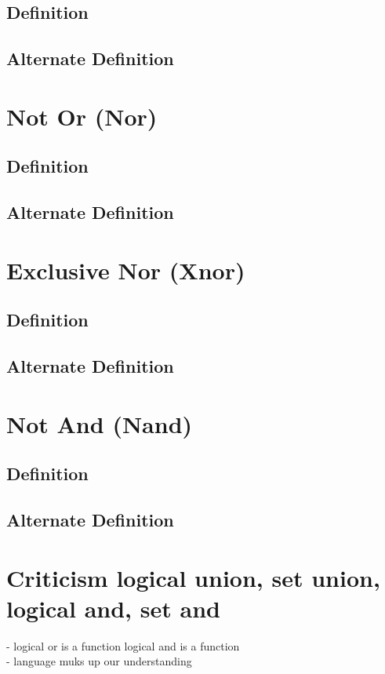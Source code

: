 \documentclass[11pt]{article}
\begin{document}
\subsection{Definition}
\subsection{Alternate Definition}





\section{Not Or (Nor)}
\subsection{Definition}
\subsection{Alternate Definition}





\section{Exclusive Nor (Xnor)}
\subsection{Definition}
\subsection{Alternate Definition}






\section{Not And (Nand)}
\subsection{Definition}
\subsection{Alternate Definition}






\section{Criticism logical union, set union, logical and, set and}
- logical or is a function logical and is a function\\
- language muks up our understanding\\
\end{document}
